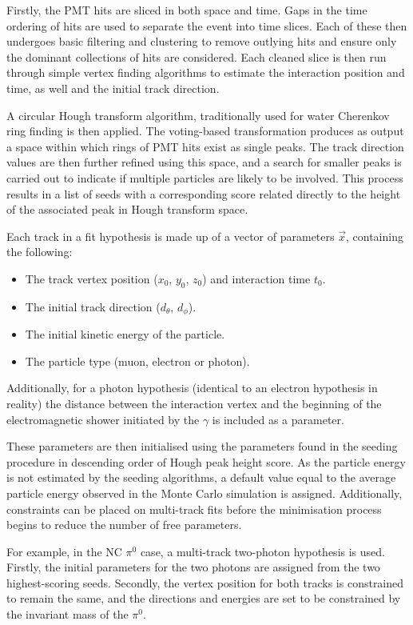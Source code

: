 Firstly, the PMT hits are sliced in both space and time. Gaps in the time ordering of hits are
used to separate the event into time slices. Each of these then undergoes basic filtering and
clustering to remove outlying hits and ensure only the dominant collections of hits are
considered. Each cleaned slice is then run through simple vertex finding algorithms to estimate
the interaction position and time, as well and the initial track direction.

A circular Hough transform algorithm, traditionally used for water Cherenkov ring finding is then
applied. The voting-based transformation produces as output a space within which rings of PMT hits
exist as single peaks. The track direction values are then further refined using this space, and a
search for smaller peaks is carried out to indicate if multiple particles are likely to be
involved. This process results in a list of seeds with a corresponding score related directly to
the height of the associated peak in Hough transform space.

Each track in a fit hypothesis is made up of a vector of parameters $\vec{x}$, containing the
following:
\begin{itemize}
    \item The track vertex position ($x_{0}$, $y_{0}$, $z_{0}$) and interaction time $t_{0}$.
    \item The initial track direction ($d_{\theta}$, $d_{\phi}$).
    \item The initial kinetic energy of the particle.
    \item The particle type (muon, electron or photon).
\end{itemize}
Additionally, for a photon hypothesis (identical to an electron hypothesis in reality) the
distance between the interaction vertex and the beginning of the electromagnetic shower initiated
by the $\gamma$ is included as a parameter.

These parameters are then initialised using the parameters found in the seeding procedure in
descending order of Hough peak height score. As the particle energy is not estimated by the
seeding algorithms, a default value equal to the average particle energy observed in the Monte
Carlo simulation is assigned. Additionally, constraints can be placed on multi-track fits before
the minimisation process begins to reduce the number of free parameters.

For example, in the NC $\pi^{0}$ case, a multi-track two-photon hypothesis is used. Firstly, the
initial parameters for the two photons are assigned from the two highest-scoring seeds. Secondly,
the vertex position for both tracks is constrained to remain the same, and the directions and
energies are set to be constrained by the invariant mass of the $\pi^{0}$.

